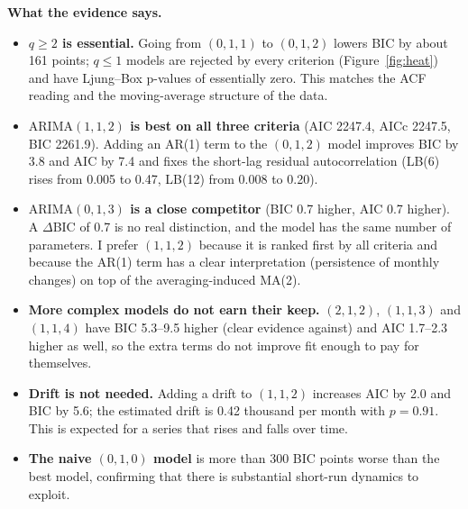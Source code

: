 \documentclass[11pt,a4paper]{article}
\newcommand{\ARIMA}[3]{\mathrm{ARIMA}(#1,#2,#3)}
\begin{document}
\textbf{What the evidence says.}
\begin{itemize}
\item \textbf{$q\ge 2$ is essential.} Going from $(0,1,1)$ to $(0,1,2)$ lowers BIC by about 161 points; $q\le 1$ models are rejected by every criterion (Figure~\ref{fig:heat}) and have Ljung--Box p-values of essentially zero. This matches the ACF reading and the moving-average structure of the data.
\item \textbf{$\ARIMA{1}{1}{2}$ is best on all three criteria} (AIC 2247.4, AICc 2247.5, BIC 2261.9). Adding an AR(1) term to the $(0,1,2)$ model improves BIC by 3.8 and AIC by 7.4 and fixes the short-lag residual autocorrelation (LB(6) rises from 0.005 to 0.47, LB(12) from 0.008 to 0.20).
\item \textbf{$\ARIMA{0}{1}{3}$ is a close competitor} (BIC 0.7 higher, AIC 0.7 higher). A $\Delta$BIC of 0.7 is no real distinction, and the model has the same number of parameters. I prefer $(1,1,2)$ because it is ranked first by all criteria and because the AR(1) term has a clear interpretation (persistence of monthly changes) on top of the averaging-induced MA(2).
\item \textbf{More complex models do not earn their keep.} $(2,1,2)$, $(1,1,3)$ and $(1,1,4)$ have BIC 5.3--9.5 higher (clear evidence against) and AIC 1.7--2.3 higher as well, so the extra terms do not improve fit enough to pay for themselves.
\item \textbf{Drift is not needed.} Adding a drift to $(1,1,2)$ increases AIC by 2.0 and BIC by 5.6; the estimated drift is 0.42 thousand per month with $p=0.91$. This is expected for a series that rises and falls over time.
\item \textbf{The naive $(0,1,0)$ model} is more than 300 BIC points worse than the best model, confirming that there is substantial short-run dynamics to exploit.
\end{itemize}
\end{document}
